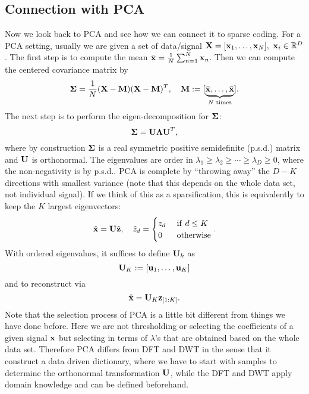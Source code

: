 \documentclass[../main.tex]{subfiles}
\begin{document}
\subsection{Connection with PCA}
Now we look back to PCA and see how we can connect it to sparse coding. For a PCA setting, usually we are given a set of data/signal ${\bf X}=[{\bf x}_1,\dots,{\bf x}_N],\ {\bf x}_i\in \mathbb{R}^D$. The first step is to compute the mean $\bar{\bf x}=\frac{1}{N}\sum_{n=1}^{N}{\bf x}_n$. Then we can compute the centered covariance matrix by
\begin{equation*}
{\bf \Sigma}=\frac{1}{N}({\bf X-M})({\bf X-M})^T,\quad {\bf M}:=[\underbrace{\bar{\bf x},\dots,\bar{\bf x}}_{N\text{ times}}].
\end{equation*}
The next step is to perform the eigen-decomposition for ${\bf \Sigma}$:
\begin{equation*}
{\bf \Sigma}={\bf U\Lambda U}^T,
\end{equation*}
where by construction ${\bf \Sigma}$ is a real symmetric positive semidefinite (p.s.d.) matrix and ${\bf U}$ is orthonormal. The eigenvalues are order in $\lambda_1\geq \lambda_2\geq \cdots\geq \lambda_D\geq 0$, where the non-negativity is by p.s.d.. PCA is complete by ``throwing away'' the $D-K$ directions with smallest variance (note that this depends on the whole data set, not individual signal). If we think of this as a sparsification, this is equivalently to keep the $K$ largest eigenvectors:
\begin{equation*}
\hat{\bf x}={\bf U}\hat{\bf z},\quad \hat{z}_d = \begin{cases}
z_d&\ {\rm if}\ d\leq K\\
0&\ {\rm otherwise}
\end{cases}.
\end{equation*}
With ordered eigenvalues, it suffices to define ${\bf U}_k$ as
\begin{equation*}
{\bf U}_K:=[{\bf u}_1,\dots,{\bf u}_K]
\end{equation*}
and to reconstruct via
\begin{equation*}
\hat{\bf x}={\bf U}_K{\bf z}_{[1:K]}.
\end{equation*}
Note that the selection process of PCA is a little bit different from things we have done before. Here we are not thresholding or selecting the coefficients of a given signal ${\bf x}$ but selecting in terms of $\lambda$'s that are obtained based on the whole data set. Therefore PCA differs from DFT and DWT in the sense that it construct a data driven dictionary, where we have to start with samples to determine the orthonormal transformation ${\bf U}$, while the DFT and DWT apply domain knowledge and can be defined beforehand.
\end{document}
